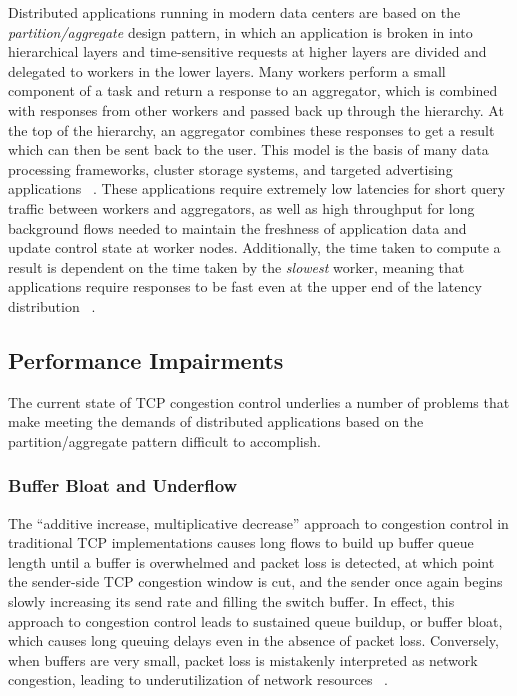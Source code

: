 Distributed applications running in modern data centers are based on the \emph{partition/aggregate} design pattern, in which an application is broken in into hierarchical layers and time-sensitive requests at higher layers are divided and delegated to workers in the lower layers. Many workers perform a small component of a task and return a response to an aggregator, which is combined with responses from other workers and passed back up through the hierarchy. At the top of the hierarchy, an aggregator combines these responses to get a result which can then be sent back to the user. This model is the basis of many data processing frameworks, cluster storage systems, and targeted advertising applications ~\cite{chen_understanding_2009, dean_mapreduce:_2004, phanishayee_measurement_2008, alizadeh_data_2010}. These applications require extremely low latencies for short query traffic between workers and aggregators, as well as high throughput for long background flows needed to maintain the freshness of application data and update control state at worker nodes. Additionally, the time taken to compute a result is dependent on the time taken by the \emph{slowest} worker, meaning that applications require responses to be fast even at the upper end of the latency distribution ~\cite{alizadeh_data_2010}. 

\subsection{Performance Impairments}

The current state of TCP congestion control underlies a number of problems that make meeting the demands of distributed applications based on the partition/aggregate pattern difficult to accomplish. 

\subsubsection{Buffer Bloat and Underflow}

The ``additive increase, multiplicative decrease'' approach to congestion control in traditional TCP implementations causes long flows to build up buffer queue length until a buffer is overwhelmed and packet loss is detected, at which point the sender-side TCP congestion window is cut, and the sender once again begins slowly increasing its send rate and filling the switch buffer. In effect, this approach to congestion control leads to sustained queue buildup, or buffer bloat, which causes long queuing delays even in the absence of packet loss. Conversely, when buffers are very small, packet loss is mistakenly interpreted as network congestion, leading to underutilization of network resources ~\cite{cardwell_bbr:_2016}.

